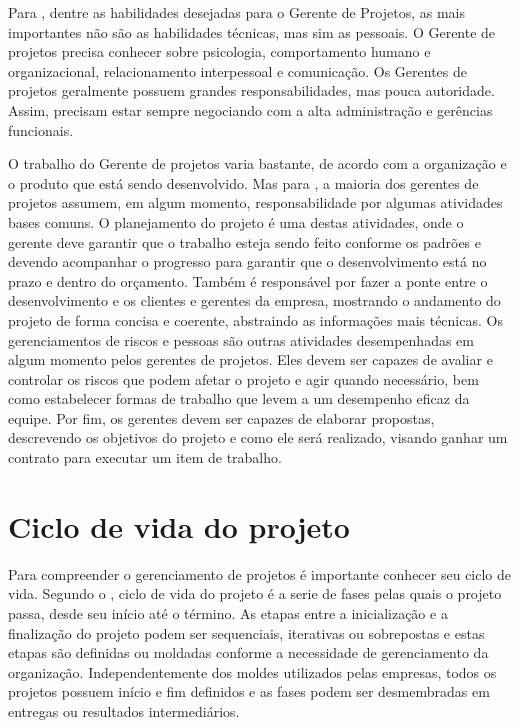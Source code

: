 \documentclass[
    12pt,               %
    openright,          %
    twoside,            %
    a4paper,            %
    chapter=TITLE,     %
    english,            %
    spanish,            %
    portuguese              %
    ]{abntex2}
\begin{document}
Para , dentre as habilidades desejadas para o Gerente de Projetos, as mais importantes não são as habilidades técnicas, mas sim as pessoais. O Gerente de projetos precisa conhecer sobre psicologia, comportamento humano e organizacional, relacionamento interpessoal e comunicação. Os Gerentes de projetos geralmente possuem grandes responsabilidades, mas pouca autoridade. Assim, precisam estar sempre negociando com a alta administração e gerências funcionais.

O trabalho do Gerente de projetos varia bastante, de acordo com a organização e o produto que está sendo desenvolvido. Mas para , a maioria dos gerentes de projetos assumem, em algum momento, responsabilidade por algumas atividades bases comuns. O planejamento do projeto é uma destas atividades, onde o gerente deve garantir que o trabalho esteja sendo feito conforme os padrões e devendo acompanhar o progresso para garantir que o desenvolvimento está no prazo e dentro do orçamento. Também é responsável por fazer a ponte entre o desenvolvimento e os clientes e gerentes da empresa, mostrando o andamento do projeto de forma concisa e coerente, abstraindo as informações mais técnicas. Os gerenciamentos de riscos e pessoas são outras atividades desempenhadas em algum momento pelos gerentes de projetos. Eles devem ser capazes de avaliar e controlar os riscos que podem afetar o projeto e agir quando necessário, bem como estabelecer formas de trabalho que levem a um desempenho eficaz da equipe. Por fim, os gerentes devem ser capazes de elaborar propostas, descrevendo os objetivos do projeto e como ele será realizado, visando ganhar um contrato para executar um item de trabalho.

\section{Ciclo de vida do projeto}
Para compreender o gerenciamento de projetos é importante conhecer seu ciclo de vida. Segundo o , ciclo de vida do projeto é a serie de fases pelas quais o projeto passa, desde seu início até o término. As etapas entre a inicialização e a finalização do projeto podem ser sequenciais, iterativas ou sobrepostas e estas etapas são definidas ou moldadas conforme a necessidade de gerenciamento da organização. Independentemente dos moldes utilizados pelas empresas, todos os projetos possuem início e fim definidos e as fases podem ser desmembradas em entregas ou resultados intermediários.
\end{document}
